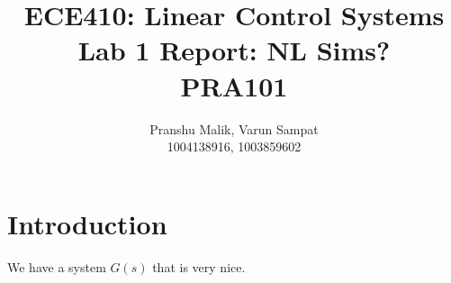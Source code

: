 \documentclass[10pt]{article}
\date{}
\begin{document}
\title{\textbf{\Large{\textsc{ECE410:} Linear Control Systems}} \\ \Large{Lab 1 Report: NL Sims?} \\ \textbf{\small{PRA101}}\vspace{-0.3cm}}
\author{Pranshu Malik, Varun Sampat \\ \footnotesize{1004138916}, \footnotesize{1003859602}\vspace{-3cm}}

\maketitle

\section{Introduction}
We have a system $G(s)$ that is very nice.
\end{document}
